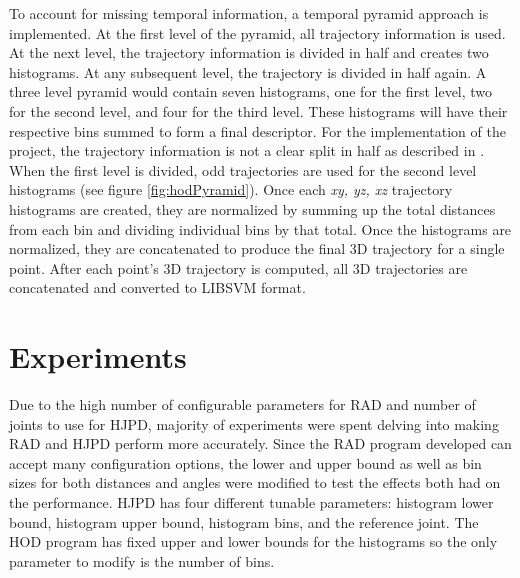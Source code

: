 \documentclass[11pt,nocopyrightspace]{config}
\begin{document}
To account for missing temporal information, a temporal pyramid approach is implemented. At the first level of the pyramid, all trajectory information is used. At the next level, the trajectory information is divided in half and creates two histograms.  At any subsequent level, the trajectory is divided in half again. A three level pyramid would contain seven histograms, one for the first level, two for the second level, and four for the third level. These histograms will have their respective bins summed to form a final descriptor. For the implementation of the project, the trajectory information is not a clear split in half as described in \cite{hodPaper}. When the first level is divided, odd trajectories are used for the second level histograms (see figure \ref{fig:hodPyramid}). Once each \emph{xy, yz, xz} trajectory histograms are created, they are normalized by summing up the total distances from each bin and dividing individual bins by that total. Once the histograms are normalized, they are concatenated to produce the final 3D trajectory for a single point. After each point's 3D trajectory is computed, all 3D trajectories are concatenated and converted to LIBSVM format.

\section{Experiments}

Due to the high number of configurable parameters for RAD and number of joints to use for HJPD, majority of experiments were spent delving into making RAD and HJPD perform more accurately. Since the RAD program developed can accept many configuration options, the lower and upper bound as well as bin sizes for both distances and angles were modified to test the effects both had on the performance. HJPD has four different tunable parameters: histogram lower bound, histogram upper bound, histogram bins, and the reference joint. The HOD program has fixed upper and lower bounds for the histograms so the only parameter to modify is the number of bins.
\end{document}
